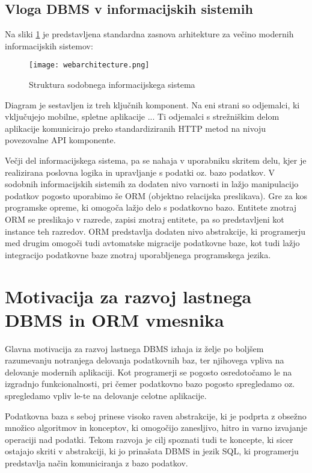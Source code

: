 \documentclass[a4paper,12pt,openright]{book}
\begin{document}
    \subsection{Vloga DBMS v informacijskih sistemih}

    Na sliki \ref{infsistem} je predstavljena standardna zasnova arhitekture za večino modernih informacijskih sistemov:
    \begin{figure}[h]
        \centerline{\texttt{[image: webarchitecture.png]}}
        \caption{Struktura sodobnega informacijskega sistema}
        \label{infsistem}
    \end{figure}

    \noindent
    Diagram je sestavljen iz treh ključnih komponent. Na eni strani so odjemalci, ki vključujejo mobilne, spletne aplikacije  ... Ti odjemalci s strežniškim delom aplikacije komunicirajo preko standardiziranih HTTP metod na nivoju povezovalne API komponente.

    Večji del informacijskega sistema, pa se nahaja v uporabniku skritem delu, kjer je realizirana poslovna logika in upravljanje s podatki oz. bazo podatkov. V sodobnih informacijskih sistemih za dodaten nivo varnosti in lažjo manipulacijo podatkov pogosto uporabimo še ORM (objektno relacijska preslikava). Gre za kos programske opreme, ki omogoča lažjo delo s podatkovno bazo. Entitete znotraj ORM se preslikajo v razrede, zapisi znotraj entitete, pa so predstavljeni kot instance teh razredov. ORM predstavlja dodaten nivo abstrakcije, ki programerju med drugim omogoči tudi avtomatske migracije podatkovne baze, kot tudi lažjo integracijo podatkovne baze znotraj uporabljenega programskega jezika.

    \section{Motivacija za razvoj lastnega DBMS in ORM vmesnika}
    Glavna motivacija za razvoj lastnega DBMS izhaja iz želje po boljšem razumevanju notranjega delovanja podatkovnih baz, ter njihovega vpliva na delovanje modernih aplikaciji. Kot programerji se pogosto osredotočamo le na izgradnjo funkcionalnosti, pri čemer podatkovno bazo pogosto spregledamo oz. spregledamo vpliv le-te na delovanje celotne aplikacije.
    
    Podatkovna baza s seboj prinese visoko raven abstrakcije, ki je podprta z obsežno množico algoritmov in konceptov, ki omogočijo zanesljivo, hitro in varno izvajanje operaciji nad podatki. Tekom razvoja je cilj spoznati tudi te koncepte, ki sicer ostajajo skriti v abstrakciji, ki jo prinašata DBMS in jezik SQL, ki programerju predstavlja način komuniciranja z bazo podatkov.
\end{document}
